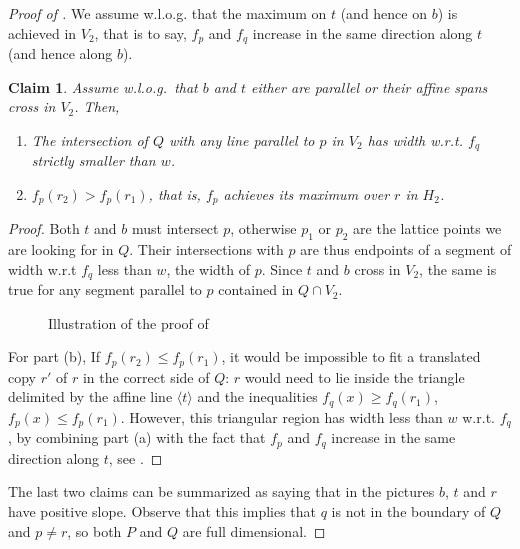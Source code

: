 \documentclass{amsart}
\theoremstyle{plain}
\newtheorem{claim}[theorem]{Claim}
\theoremstyle{definition}
\begin{document}
\begin{proof}[Proof of ]
We assume w.l.o.g. that the maximum on $t$ (and hence on $b$) is achieved in $V_2$, that is to say, $f_p$ and $f_q$ increase in the same direction along $t$ (and hence along $b$). 

\begin{claim}
\label{claim:r}
Assume w.l.o.g.~that $b$ and $t$ either are parallel or their affine spans cross in $V_2$. Then, 
\begin{enumerate}
\item The intersection of $Q$ with any line parallel to $p$ in $V_2$ has width w.r.t. $f_q$ strictly smaller than $w$.
\item $f_p(r_2) > f_p(r_1)$, that is, $f_p$ achieves its maximum over $r$ in $H_2$.
\end{enumerate}
\end{claim}

\begin{proof}
Both $t$ and $b$ must intersect $p$, otherwise $p_1$ or $p_2$ are the lattice points we are looking for in $Q$.  Their intersections with $p$ are thus endpoints of a segment of width w.r.t $f_q$ less than $w$, the width of $p$. Since $t$ and $b$ cross in $V_2$, the same is true for any segment parallel to $p$ contained in $Q \cap V_2$.  

\begin{figure}[htb]
\scalebox{.75}{}
\caption{Illustration of the proof of }
\label{fig:claim3}
\end{figure}

For part (b), If $f_p(r_2) \leq f_p(r_1)$, it would be impossible to fit a translated copy $r'$ of $r$ in the correct side of $Q$: $r$ would need to lie inside the triangle delimited by the affine line $\langle t \rangle$ and the inequalities $f_q(x) \geq f_q(r_1)$, $f_p(x) \leq f_p(r_1)$. However, this triangular region has width less than $w$  w.r.t. $f_q$, by combining part (a) with the fact that $f_p$ and $f_q$ increase in the same direction along $t$, see . 
\end{proof}

The last two claims can be summarized as saying that in the pictures $b$, $t$ and $r$ have positive slope. Observe that this implies that $q$ is not in the boundary of $Q$ and $p \neq r$, so both $P$ and $Q$ are full dimensional.


\end{proof}
\end{document}
